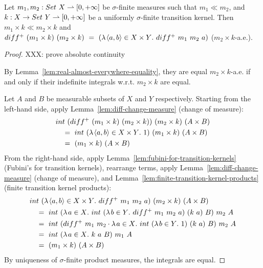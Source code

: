 \begin{theorem}
Let $m_1,m_2 : Set~X \rightharpoonup [0,+\infty]$ be $\sigma$-finite measures such that $m_1 \ll m_2$, and $k : X \to Set~Y \rightharpoonup [0,+\infty]$ be a uniformly $\sigma$-finite transition kernel.
Then $m_1 \times k \ll m_2 \times k$ and $diff^+~(m_1 \times k)~(m_2 \times k)\ =\ (\fun{\pair{a,b} \in X \times Y} diff^+~m_1~m_2~a)$ ($m_2 \times k$-a.e.).
\end{theorem}
\begin{proof}
XXX: prove absolute continuity

By Lemma~\ref{lem:real-almost-everywhere-equality}, they are equal $m_2 \times k$-a.e. if and only if their indefinite integrals w.r.t. $m_2 \times k$ are equal.

Let $A$ and $B$ be measurable subsets of $X$ and $Y$ respectively.
Starting from the left-hand side, apply Lemma~\ref{lem:diff-change-measure} (change of measure):
\begin{equation}
\begin{aligned}
	&int~(diff^+~(m_1 \times k)~(m_2 \times k))~(m_2 \times k)~(A \times B)
\\
	&\ \ \ =\ int~(\lambda\mspace{2mu}{\langle{a,b}\rangle \in X \times Y}\ldotp\, 1)~(m_1 \times k)~(A \times B)
\\
	&\ \ \ =\ (m_1 \times k)~(A \times B)
\end{aligned}
\end{equation}
From the right-hand side, apply Lemma~\ref{lem:fubini-for-transition-kernels} (Fubini's for transition kernels), rearrange terms, apply Lemma~\ref{lem:diff-change-measure} (change of measure), and Lemma~\ref{lem:finite-transition-kernel-products} (finite transition kernel products):
\begin{equation}
\begin{aligned}
	&int~(\lambda\mspace{2mu}{\langle{a,b}\rangle \in X \times Y}\ldotp\, diff^+~m_1~m_2~a)~(m_2 \times k)~(A \times B)
\\
	&\ \ \ =\ int~(\lambda\mspace{2mu}{a \in X}\ldotp\, int~(\lambda\mspace{2mu}{b \in Y}\ldotp\, diff^+~m_1~m_2~a)~(k~a)~B)~m_2~A
\\
	&\ \ \ =\ int~(diff^+~m_1~m_2 \cdot \lambda\mspace{2mu}{a \in X}\ldotp\, int~(\lambda\mspace{2mu}{b \in Y}\ldotp\, 1)~(k~a)~B)~m_2~A
\\
	&\ \ \ =\ int~(\lambda\mspace{2mu}{a \in X}\ldotp\, k~a~B)~m_1~A
\\
	&\ \ \ =\ (m_1 \times k)~(A \times B)
\end{aligned}
\end{equation}
By uniqueness of $\sigma$-finite product measures, the integrals are equal.
\end{proof}


